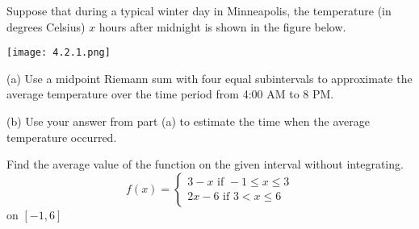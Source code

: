 \documentclass[../bccalc.tex]{subfiles}
\begin{document}
\pagebreak
\ex Suppose that during a typical winter day in Minneapolis, the temperature (in degrees Celsius) $x$ hours after midnight is shown in the figure below.
\begin{center}
    \texttt{[image: 4.2.1.png]}
\end{center}
(a) Use a midpoint Riemann sum with four equal subintervals to approximate the average temperature over the time period from 4:00 AM to 8 PM.

(b) Use your answer from part (a) to estimate the time when the average temperature occurred.

\ex Find the average value of the function on the given interval without integrating.
\[ f(x)=\begin{cases}
    3-x \text{ if } -1\leq x\leq 3 \\
    2x-6 \text{ if } 3<x\leq 6
\end{cases} \] on $[-1,6]$
\end{document}
